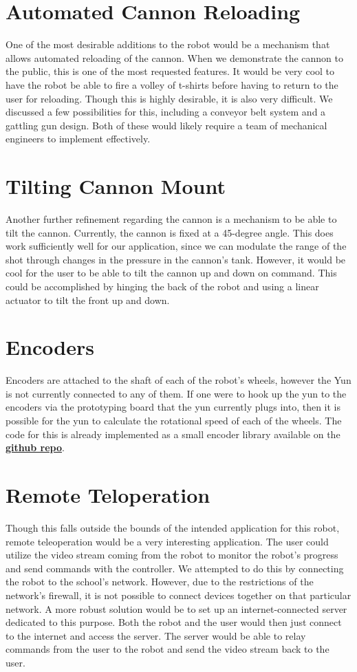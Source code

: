 \documentclass[letterpaper,12pt]{report}
\newcommand{\github}{\href{https://github.com/cometcannon/tshirt-cannon-robot}
        {\textbf{github repo}}}
\begin{document}
\section{Automated Cannon Reloading}
One of the most desirable additions to the robot would be a mechanism that
allows automated reloading of the cannon. When we demonstrate the cannon to the
public, this is one of the most requested features. It would be very cool to
have the robot be able to fire a volley of t-shirts before having to return to
the user for reloading. Though this is highly desirable, it is also very
difficult. We discussed a few possibilities for this, including a conveyor belt
system and a gattling gun design. Both of these would likely require a team of
mechanical engineers to implement effectively.

\section{Tilting Cannon Mount}
Another further refinement regarding the cannon is a mechanism to be able to
tilt the cannon. Currently, the cannon is fixed at a 45-degree angle. This does
work sufficiently well for our application, since we can modulate the range of
the shot through changes in the pressure in the cannon's tank. However, it would
be cool for the user to be able to tilt the cannon up and down on command. This
could be accomplished by hinging the back of the robot and using a linear
actuator to tilt the front up and down.

\section{Encoders}
Encoders are attached to the shaft of each of the robot's wheels, however the
Yun is not currently connected to any of them. If one were to hook up the yun
to the encoders via the prototyping board that the yun currently plugs into,
then it is possible for the yun to calculate the rotational speed of each of
the wheels. The code for this is already implemented as a small encoder library
available on the \github.

\section{Remote Teloperation}
Though this falls outside the bounds of the intended application for this robot,
remote teleoperation would be a very interesting application. The user could
utilize the video stream coming from the robot to monitor the robot's progress
and send commands with the controller. We attempted to do this by connecting the
robot to the school's network. However, due to the restrictions of the network's
firewall, it is not possible to connect devices together on that particular
network. A more robust solution would be to set up an internet-connected server
dedicated to this purpose. Both the robot and the user would then just connect
to the internet and access the server. The server would be able to relay
commands from the user to the robot and send the video stream back to the user.
\end{document}
